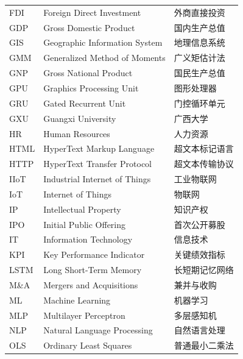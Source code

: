 \begin{longtable}{@{}lll@{}}
    FDI   & Foreign Direct Investment                      & 外商直接投资 \\
    GDP   & Gross Domestic Product                         & 国内生产总值 \\
    GIS   & Geographic Information System                  & 地理信息系统 \\
    GMM   & Generalized Method of Moments                  & 广义矩估计法 \\
    GNP   & Gross National Product                         & 国民生产总值 \\
    GPU   & Graphics Processing Unit                       & 图形处理器 \\
    GRU   & Gated Recurrent Unit                           & 门控循环单元 \\
    GXU   & Guangxi University                             & 广西大学 \\
    HR    & Human Resources                                & 人力资源 \\
    HTML  & HyperText Markup Language                      & 超文本标记语言 \\
    HTTP  & HyperText Transfer Protocol                    & 超文本传输协议 \\
    IIoT  & Industrial Internet of Things                  & 工业物联网 \\
    IoT   & Internet of Things                             & 物联网 \\
    IP    & Intellectual Property                          & 知识产权 \\
    IPO   & Initial Public Offering                        & 首次公开募股 \\
    IT    & Information Technology                         & 信息技术 \\
    KPI   & Key Performance Indicator                      & 关键绩效指标 \\
    LSTM  & Long Short-Term Memory                         & 长短期记忆网络 \\
    M\&A  & Mergers and Acquisitions                       & 兼并与收购 \\
    ML    & Machine Learning                               & 机器学习 \\
    MLP   & Multilayer Perceptron                          & 多层感知机 \\
    NLP   & Natural Language Processing                    & 自然语言处理 \\
    OLS   & Ordinary Least Squares                         & 普通最小二乘法 \\

\end{longtable}
